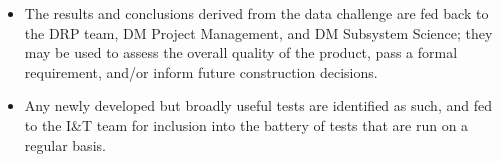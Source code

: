 \begin{itemize}
\item The results and conclusions derived from the data challenge are fed back to
the DRP team, DM Project Management, and DM Subsystem Science; they may be
used to assess the overall quality of the product, pass a formal
requirement, and/or inform future construction decisions.

\item Any newly developed but broadly useful tests are identified as such,
and fed to the I\&T team for inclusion into the battery of tests that are
run on a regular basis.

\end{itemize}

